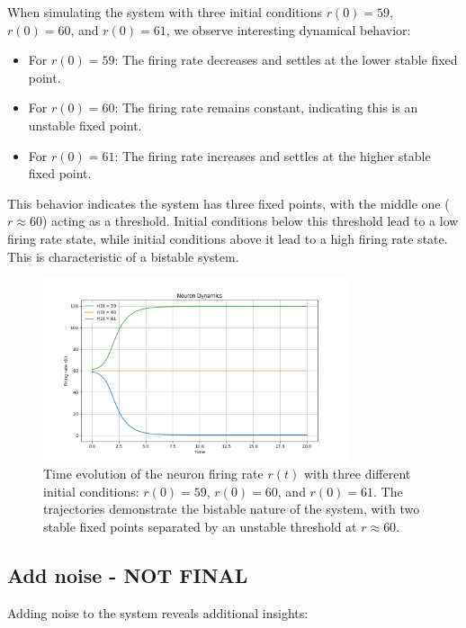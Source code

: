 \documentclass{article}
\begin{document}
When simulating the system with three initial conditions $r(0) = 59$, $r(0) = 60$, and $r(0) = 61$, we observe interesting dynamical behavior:

\begin{itemize}
    \item For $r(0) = 59$: The firing rate decreases and settles at the lower stable fixed point.
    \item For $r(0) = 60$: The firing rate remains constant, indicating this is an unstable fixed point.
    \item For $r(0) = 61$: The firing rate increases and settles at the higher stable fixed point.
\end{itemize}

This behavior indicates the system has three fixed points, with the middle one ($r \approx 60$) acting as a threshold. Initial conditions below this threshold lead to a low firing rate state, while initial conditions above it lead to a high firing rate state. This is characteristic of a bistable system.

\begin{figure}[H]
    \centering
    \includegraphics[width=0.8\textwidth]{deterministic_dynamics.png}
    \caption{Time evolution of the neuron firing rate $r(t)$ with three different initial conditions: $r(0) = 59$, $r(0) = 60$, and $r(0) = 61$. The trajectories demonstrate the bistable nature of the system, with two stable fixed points separated by an unstable threshold at $r \approx 60$.}
    \label{fig:deterministic}
\end{figure}

\subsection{Add noise - NOT FINAL}

Adding noise to the system reveals additional insights:
\end{document}
